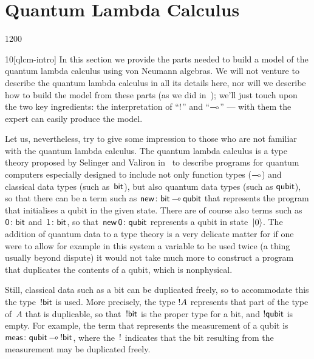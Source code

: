 \section{Quantum Lambda Calculus}
\label{S:model}
\begin{parsec}{1200}%
\begin{point}{10}[qlcm-intro]%
In this section we provide
the parts needed
to build a model
	of the quantum lambda calculus
using von Neumann algebras.
We will not venture
to describe the quantum lambda calculus
in all its details here,
nor will we describe how to build the model
from these parts
(as we did in~\cite{model});
we'll just touch upon
the two key ingredients:
the interpretation of ``$\mathord{!}$'' and ``$\mathbin{\multimap}$''%
---
with them the expert
can easily produce the model.

Let us, nevertheless, try to give some impression to those who are not familiar 
with the quantum lambda calculus.
The quantum lambda calculus is a type theory
proposed by Selinger and Valiron in~\cite{selinger2005,selinger2006}
to describe programs for quantum computers
especially designed
to include 
not only
function types ($\mathbin{\multimap}$)
and
classical data types (such as~$\mathsf{bit}$),
but also quantum data types
(such as $\mathsf{qubit}$),
so that there can be a term such as
$\mathsf{new}\colon \mathsf{bit}\mathbin{\multimap} \mathsf{qubit}$
that represents the program
that initialises a qubit in the given state.
There are of course also terms
such as
$\mathsf{0}\colon \mathsf{bit}$
and~$\mathsf{1}\colon \mathsf{bit}$,
so that~$\mathsf{new}\,\mathsf{0}\colon \mathsf{qubit}$
represents a qubit in state~$\ket{0}$.
The addition of quantum data 
to a type theory
is a very delicate matter
for if one were to allow
for example
in this system
a variable to be used twice
(a thing usually beyond dispute)
it would not take much more
to construct
a program
that duplicates the contents
of a qubit,
which is nonphysical.

Still, classical data
such as a bit
can be duplicated freely,
so to accommodate this 
the type~$\mathord{!} \mathsf{bit}$ is used.
More precisely,
the type
$\mathord{!} A$
represents that part of the type of~$A$ that is duplicable,
so that~$\mathord{!} \mathsf{bit}$
is the proper type for a bit,
and $\mathord{!}\mathsf{qubit}$ is empty.
For example,
the term that represents the measurement
of a qubit is~$\mathsf{meas}\colon \mathsf{qubit}\mathbin{\multimap} \mathord{!}\mathsf{bit}$,
where the~$\mathord{!}$ indicates that the bit resulting from the measurement
may be duplicated freely.


\end{point}
\end{parsec}
